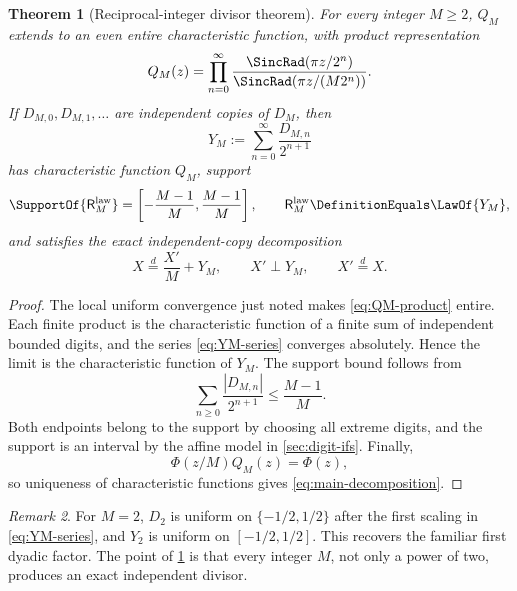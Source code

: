 \documentclass[11pt,oneside]{article}
\newtheorem{theorem}{Theorem}[section]
\theoremstyle{definition}
\theoremstyle{remark}
\newtheorem{remark}[theorem]{Remark}
\newcommand{\ReciprocalIntegerLaw}[1]{\mathsf R^{\mathrm{law}}_{#1}}
\begin{document}
\begin{theorem}[Reciprocal-integer divisor theorem]
\label{thm:divisor}
For every integer $M\ge2$, $Q_M$ extends to an even entire characteristic function,
with product representation
\begin{equation}
 Q_M(z)=\prod_{n=0}^{\infty}
 \frac{\SincRad(\pi z/2^n)}{\SincRad(\pi z/(M2^n))}.
 \label{eq:QM-product}
\end{equation}
If $D_{M,0},D_{M,1},\ldots$ are independent copies of $D_M$, then
\begin{equation}
 Y_M:=\sum_{n=0}^{\infty}\frac{D_{M,n}}{2^{n+1}}
 \label{eq:YM-series}
\end{equation}
has characteristic function $Q_M$, support
\begin{equation}
 \SupportOf{\ReciprocalIntegerLaw{M}}=\left[-\frac{M-1}{M},\frac{M-1}{M}\right],
 \qquad \ReciprocalIntegerLaw{M}\DefinitionEquals\LawOf{Y_M},
 \label{eq:nu-support}
\end{equation}
and satisfies the exact independent-copy decomposition
\begin{equation}
 X\overset d=\frac{X'}{M}+Y_M,
 \qquad X'\perp Y_M,
 \qquad X'\overset d=X.
 \label{eq:main-decomposition}
\end{equation}
\end{theorem}

\begin{proof}
The local uniform convergence just noted makes \eqref{eq:QM-product} entire.  Each finite
product is the characteristic function of a finite sum of independent bounded digits, and
the series \eqref{eq:YM-series} converges absolutely.  Hence the limit is the
characteristic function of $Y_M$.  The support bound follows from
\[
 \sum_{n\ge0}\frac{|D_{M,n}|}{2^{n+1}}
 \le\frac{M-1}{M}.
\]
Both endpoints belong to the support by choosing all extreme digits, and the support is an
interval by the affine model in \cref{sec:digit-ifs}.  Finally,
\[
 \Phi(z/M)Q_M(z)=\Phi(z),
\]
so uniqueness of characteristic functions gives \eqref{eq:main-decomposition}.
\end{proof}

\begin{remark}
For $M=2$, $D_2$ is uniform on $\{-1/2,1/2\}$ after the first scaling in
\eqref{eq:YM-series}, and $Y_2$ is uniform on $[-1/2,1/2]$.  This recovers the
familiar first dyadic factor.  The point of \cref{thm:divisor} is that every integer
$M$, not only a power of two, produces an exact independent divisor.
\end{remark}
\end{document}
